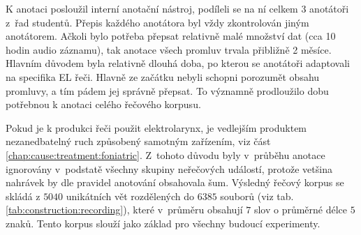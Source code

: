 K anotaci posloužil interní anotační nástroj, podíleli se na ní celkem 3 anotátoři z~řad studentů.
Přepis každého anotátora byl vždy zkontrolován jiným anotátorem.
Ačkoli bylo potřeba přepsat relativně malé množství dat (cca 10 hodin audio záznamu), tak anotace všech promluv trvala přibližně 2 měsíce.
Hlavním důvodem byla relativně dlouhá doba, po kterou se anotátoři adaptovali na specifika EL řeči.
Hlavně ze začátku nebyli schopni porozumět obsahu promluvy, a tím pádem jej správně přepsat.
To významně prodloužilo dobu potřebnou k anotaci celého řečového korpusu.

Pokud je k produkci řeči použit elektrolarynx, je vedlejším produktem nezanedbatelný ruch způsobený samotným zařízením, viz část \ref{chap:cause:treatment:foniatric}.
Z~tohoto důvodu byly v~průběhu anotace ignorovány v~podstatě všechny skupiny neřečových událostí, protože vetšina nahrávek by dle pravidel anotování obsahovala šum.
Výsledný řečový korpus se skládá z $5040$ unikátních vět rozdělených do $6385$ souborů (viz tab. \ref{tab:construction:recording}), které v~průměru obsahují $7$ slov o průměrné délce $5$ znaků. Tento korpus slouží jako základ pro všechny budoucí experimenty.
